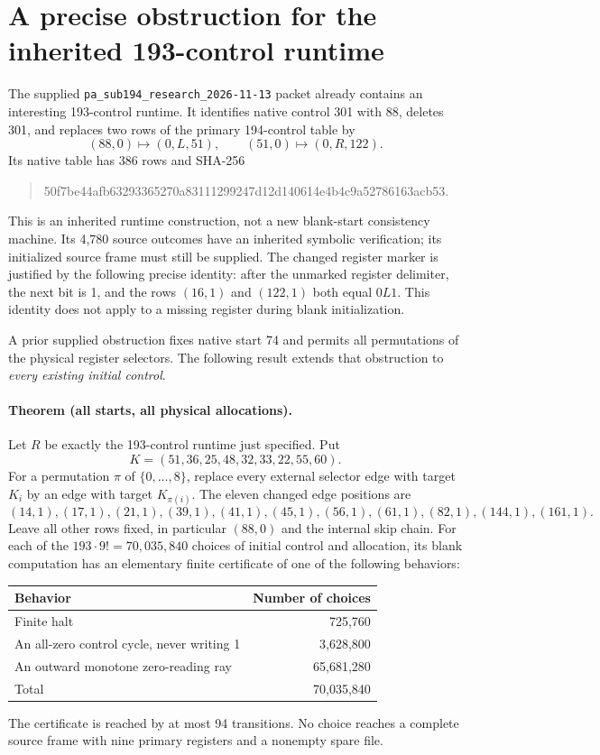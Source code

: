\section{A precise obstruction for the inherited 193-control runtime}

The supplied \texttt{pa\_sub194\_research\_2026-11-13} packet already contains
an interesting 193-control runtime.  It identifies native control 301 with
88, deletes 301, and replaces two rows of the primary 194-control table by
\[
 (88,0)\mapsto(0,L,51),\qquad (51,0)\mapsto(0,R,122).
\]
Its native table has 386 rows and SHA-256
\begin{quote}\small\ttfamily
50f7be44afb63293365270a83111299247d12d140614e4b4c9a52786163acb53.
\end{quote}
This is an inherited runtime construction, not a new blank-start consistency
machine.  Its 4,780 source outcomes have an inherited symbolic verification;
its initialized source frame must still be supplied.  The changed register
marker is justified by the following precise identity: after the unmarked
register delimiter, the next bit is 1, and the rows $(16,1)$ and $(122,1)$
both equal $0L1$.  This identity does not apply to a missing register during
blank initialization.

A prior supplied obstruction fixes native start 74 and permits all
permutations of the physical register selectors.  The following result
extends that obstruction to \emph{every existing initial control}.

\paragraph{Theorem (all starts, all physical allocations).}
Let $R$ be exactly the 193-control runtime just specified.  Put
\[
 K=(51,36,25,48,32,33,22,55,60).
\]
For a permutation $\pi$ of $\{0,\ldots,8\}$, replace every external selector
edge with target $K_i$ by an edge with target $K_{\pi(i)}$.  The eleven changed
edge positions are
\[
 (14,1),(17,1),(21,1),(39,1),(41,1),(45,1),
 (56,1),(61,1),(82,1),(144,1),(161,1).
\]
Leave all other rows fixed, in particular $(88,0)$ and the internal skip
chain.  For each of the $193\cdot9!=70{,}035{,}840$ choices of initial
control and allocation, its blank computation has an elementary finite
certificate of one of the following behaviors:
\begin{center}
\begin{tabular}{lr}
\hline
Behavior & Number of choices\\\hline
Finite halt & 725,760\\
An all-zero control cycle, never writing 1 & 3,628,800\\
An outward monotone zero-reading ray & 65,681,280\\\hline
Total & 70,035,840\\\hline
\end{tabular}
\end{center}
The certificate is reached by at most 94 transitions.  No choice reaches a
complete source frame with nine primary registers and a nonempty spare file.

